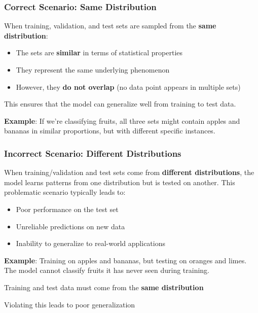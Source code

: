 \documentclass[11pt,a4paper]{article}
\theoremstyle{definition}
\theoremstyle{plain}
\theoremstyle{remark}
\begin{document}
\subsubsection{Correct Scenario: Same Distribution}

When training, validation, and test sets are sampled from the \textbf{same distribution}:
\begin{itemize}
    \item The sets are \textbf{similar} in terms of statistical properties
    \item They represent the same underlying phenomenon
    \item However, they \textbf{do not overlap} (no data point appears in multiple sets)
\end{itemize}

This ensures that the model can generalize well from training to test data.

\textbf{Example}: If we're classifying fruits, all three sets might contain apples and bananas in similar proportions, but with different specific instances.

\subsubsection{Incorrect Scenario: Different Distributions}

When training/validation and test sets come from \textbf{different distributions}, the model learns patterns from one distribution but is tested on another. This problematic scenario typically leads to:
\begin{itemize}
    \item Poor performance on the test set
    \item Unreliable predictions on new data
    \item Inability to generalize to real-world applications
\end{itemize}

\textbf{Example}: Training on apples and bananas, but testing on oranges and limes. The model cannot classify fruits it has never seen during training.

\begin{tcolorbox}[colback=orange!5!white,colframe=orange!75!black,title=\textbf{Key Principle}]
\begin{center}
Training and test data must come from the \textbf{same distribution}

Violating this leads to poor generalization
\end{center}
\end{tcolorbox}
\end{document}
